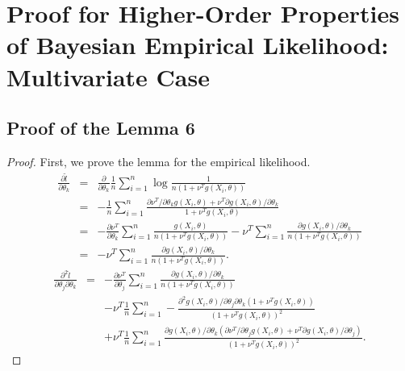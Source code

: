 \chapter{Proof for Higher-Order Properties of Bayesian Empirical Likelihood:
Multivariate Case}
\section{Proof of the Lemma 6}
\begin{proof}
First, we prove the lemma for the empirical likelihood.
	\begin{eqnarray*}
\frac{\partial\tilde{l}}{\partial\theta_{k}} & = & \frac{\partial}{\partial\theta_{k}}\frac{1}{n}\sum_{i=1}^{n}\log\frac{1}{n\left(1+\nu^{T}g\left(X_{i},\theta\right)\right)}\\
 & = & -\frac{1}{n}\sum_{i=1}^{n}\frac{{\partial\nu^{T}} / {\partial\theta_{k}}g\left(X_{i},\theta\right)+\nu^{T}{\partial g\left(X_{i},\theta\right)} / {\partial\theta_{k}}}{1+\nu^{T}g\left(X_{i},\theta\right)}\\
 & = & -\frac{\partial\nu^{T}}{\partial\theta_{k}}\sum_{i=1}^{n}\frac{g\left(X_{i},\theta\right)}{n\left(1+\nu^{T}g\left(X_{i},\theta\right)\right)}-\nu^{T}\sum_{i=1}^{n}\frac{{\partial g\left(X_{i},\theta\right)} / {\partial\theta_{k}}}{n\left(1+\nu^{T}g\left(X_{i},\theta\right)\right)}\\
 & = & -\nu^{T}\sum_{i=1}^{n}\frac{{\partial g\left(X_{i},\theta\right)} / {\partial\theta_{k}}}{n\left(1+\nu^{T}g\left(X_{i},\theta\right)\right)}.
\end{eqnarray*}
\begin{eqnarray*}
\frac{\partial^{2}\hat{l}}{\partial\theta_{j}\partial\theta_{k}} & = & -\frac{\partial\nu^{T}}{\partial\theta_{j}}\sum_{i=1}^{n}\frac{{\partial g\left(X_{i},\theta\right)} / {\partial\theta_{k}}}{n\left(1+\nu^{T}g\left(X_{i},\theta\right)\right)}\\
 &  & -\nu^{T}\frac{1}{n}\sum_{i=1}^{n}-\frac{{\partial^{2}g\left(X_{i},\theta\right)} / {\partial\theta_{j}\partial\theta_{k}}\left(1+\nu^{T}g\left(X_{i},\theta\right)\right) }{\left(1+\nu^{T}g\left(X_{i},\theta\right)\right)^{2}}\\
 & & +\nu^T \frac{1}{n}\sum_{i=1}^{n} \frac{{\partial g\left(X_{i},\theta\right)} / {\partial\theta_{k}}\left({\partial\nu^{T}} / {\partial\theta_{j}}g\left(X_{i},\theta\right)+\nu^{T}{\partial g\left(X_{i},\theta\right)} / {\partial\theta_{j}}\right)}{\left(1+\nu^{T}g\left(X_{i},\theta\right)\right)^{2}}.
\end{eqnarray*}


\end{proof}
